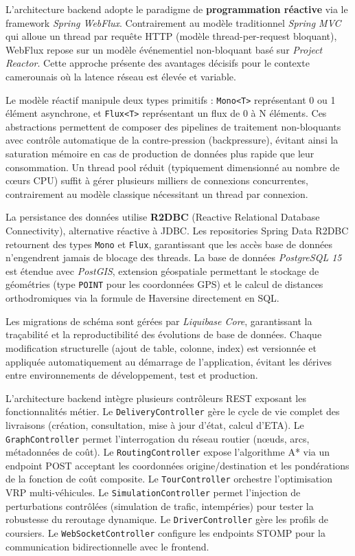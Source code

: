 L'architecture backend adopte le paradigme de \textbf{programmation réactive} via le framework \textit{Spring WebFlux}. Contrairement au modèle traditionnel \textit{Spring MVC} qui alloue un thread par requête HTTP (modèle thread-per-request bloquant), WebFlux repose sur un modèle événementiel non-bloquant basé sur \textit{Project Reactor}. Cette approche présente des avantages décisifs pour le contexte camerounais où la latence réseau est élevée et variable\cite{datareportal_cm}.

Le modèle réactif manipule deux types primitifs : \texttt{Mono<T>} représentant 0 ou 1 élément asynchrone, et \texttt{Flux<T>} représentant un flux de 0 à N éléments. Ces abstractions permettent de composer des pipelines de traitement non-bloquants avec contrôle automatique de la contre-pression (backpressure), évitant ainsi la saturation mémoire en cas de production de données plus rapide que leur consommation. Un thread pool réduit (typiquement dimensionné au nombre de cœurs CPU) suffit à gérer plusieurs milliers de connexions concurrentes, contrairement au modèle classique nécessitant un thread par connexion.

La persistance des données utilise \textbf{R2DBC} (Reactive Relational Database Connectivity), alternative réactive à JDBC. Les repositories Spring Data R2DBC retournent des types \texttt{Mono} et \texttt{Flux}, garantissant que les accès base de données n'engendrent jamais de blocage des threads. La base de données \textit{PostgreSQL 15} est étendue avec \textit{PostGIS}, extension géospatiale permettant le stockage de géométries (type \texttt{POINT} pour les coordonnées GPS) et le calcul de distances orthodromiques via la formule de Haversine directement en SQL.

Les migrations de schéma sont gérées par \textit{Liquibase Core}, garantissant la traçabilité et la reproductibilité des évolutions de base de données. Chaque modification structurelle (ajout de table, colonne, index) est versionnée et appliquée automatiquement au démarrage de l'application, évitant les dérives entre environnements de développement, test et production.

L'architecture backend intègre plusieurs contrôleurs REST exposant les fonctionnalités métier. Le \texttt{DeliveryController} gère le cycle de vie complet des livraisons (création, consultation, mise à jour d'état, calcul d'ETA). Le \texttt{GraphController} permet l'interrogation du réseau routier (nœuds, arcs, métadonnées de coût). Le \texttt{RoutingController} expose l'algorithme A* via un endpoint POST acceptant les coordonnées origine/destination et les pondérations de la fonction de coût composite. Le \texttt{TourController} orchestre l'optimisation VRP multi-véhicules. Le \texttt{SimulationController} permet l'injection de perturbations contrôlées (simulation de trafic, intempéries) pour tester la robustesse du reroutage dynamique. Le \texttt{DriverController} gère les profils de coursiers. Le \texttt{WebSocketController} configure les endpoints STOMP pour la communication bidirectionnelle avec le frontend.

